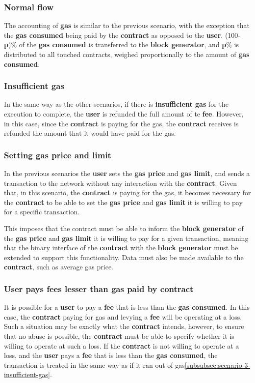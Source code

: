 \documentclass[twocolumn, nofootinbib]{revtex4-2} %
\newcommand{\emphasize}[1]{\textbf{#1}\xspace}
\newcommand{\blockgenerator}{\emphasize{block generator}}
\newcommand{\contract}{\emphasize{contract}}
\newcommand{\fee}{\emphasize{fee}}
\newcommand{\gas}{\emphasize{gas}}
\newcommand{\gasprice}{\emphasize{gas price}}
\newcommand{\gaslimit}{\emphasize{gas limit}}
\newcommand{\gasconsumed}{\emphasize{gas consumed}}
\newcommand{\insufficientgas}{\emphasize{insufficient gas}}
\newcommand{\user}{\emphasize{user}}
\newcommand{\emphp}{\emphasize{p}}
\begin{document}
    \subsubsection*{Normal flow}\label{subsubsec:scenario-3-normal-flow}
    The accounting of \gas is similar to the previous scenario, with the exception
    that the \gasconsumed being paid by the \contract as opposed to the \user.
    (100-\emphp)\% of the \gasconsumed is transferred to the \blockgenerator, and
    \emphp\% is distributed to all touched contracts, weighed proportionally to the
    amount of \gasconsumed.

    \subsubsection*{Insufficient gas}\label{subsubsec:scenario-3-insufficient-gas}
    In the same way as the other scenarios, if there is \insufficientgas for the
    execution to complete, the \user is refunded the full amount of te \fee.
    However, in this case, since the \contract is paying for the gas, the \contract
    receives is refunded the amount that it would have paid for the gas.

    \subsubsection*{Setting gas price and limit}\label{subsubsec:scenario-3-setting-gas-price-and-limit}
    In the previous scenarios the \user sets the \gasprice and \gaslimit, and
    sends a transaction to the network without any interaction with the \contract.
    Given that, in this scenario, the \contract is paying for the gas, it becomes
    necessary for the \contract to be able to set the \gasprice and \gaslimit it
    is willing to pay for a specific transaction.

    This imposes that the contract must be able to inform the \blockgenerator of
    the \gasprice and \gaslimit it is willing to pay for a given transaction,
    meaning that the binary interface of the \contract with the \blockgenerator
    must be extended to support this functionality.
    Data must also be made available to the \contract, such as average gas price.

    \subsubsection*{User pays fees lesser than gas paid by contract}\label{subsubsec:scenario-3-user-pays-fees-lesser}
    It is possible for a \user to pay a \fee that is less than the \gasconsumed.
    In this case, the \contract paying for gas and levying a \fee will be
    operating at a loss.
    Such a situation may be exactly what the \contract intends, however, to
    ensure that no abuse is possible, the \contract must be able to specify
    whether it is willing to operate at such a loss.
    If the \contract is not willing to operate at a loss, and the \user pays
    a \fee that is less than the \gasconsumed, the transaction is treated in
    the same way as if it ran out of gas\ref{subsubsec:scenario-3-insufficient-gas}.
\end{document}
